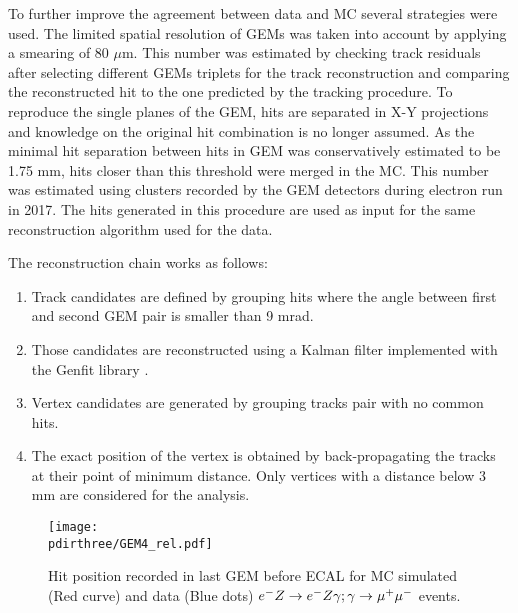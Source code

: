 To further improve the agreement between data and MC several strategies were used. The limited spatial resolution of GEMs was taken into account by applying a smearing of 80 $\mu$m. This number was estimated by checking track residuals after selecting different GEMs triplets for the track reconstruction and comparing the reconstructed hit to the one predicted by the tracking procedure. To reproduce the single planes of the GEM, hits are separated in X-Y projections and knowledge on the original hit combination is no longer assumed. As the minimal hit separation between hits in GEM was conservatively estimated to be 1.75 mm, hits closer than this threshold were merged in the MC. This number was estimated using clusters recorded by the GEM detectors during electron run in 2017. The hits generated in this procedure are used as input for the same reconstruction algorithm used for the data.

The reconstruction chain works as follows:
\begin{enumerate}
\item Track candidates are defined by grouping hits where the angle between first and second GEM pair is smaller than 9 mrad.
\item Those candidates are reconstructed using a Kalman filter implemented with the Genfit library \cite{genfit}.
\item Vertex candidates are generated by grouping tracks pair with no common hits.
\item The exact position of the vertex is obtained by back-propagating the tracks at their point of minimum distance. Only vertices with a distance below 3 mm are considered for the analysis.
\end{enumerate}

\begin{figure}[tbh!]
  \begin{center}
    \texttt{[image: \\pdirthree/GEM4\_rel.pdf]}
  \end{center}

  \caption[Hit position of $\emu$ in GEM MC-DATA]{Hit position recorded in last GEM before ECAL for MC simulated (Red curve) and data (Blue dots) $\emu$ events.}
  \label{fig:dimuon:gemspectra}
\end{figure}
  

